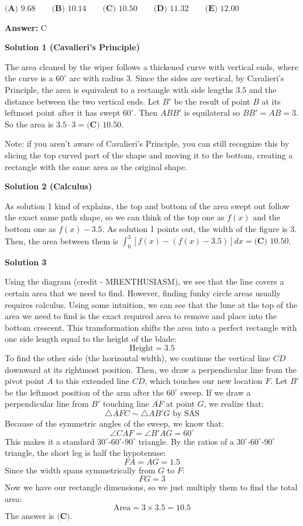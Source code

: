 \begin{enumerate}
 $\textbf{(A) } 9.68 \qquad \textbf{(B) } 10.14 \qquad \textbf{(C) } 10.50 \qquad \textbf{(D) } 11.32 \qquad \textbf{(E) } 12.00$

 \textbf{Answer: }C



\textbf{Solution 1 (Cavalieri's Principle)}

The area cleaned by the wiper follows a thickened curve with vertical ends, where the curve is a $60^\circ$ arc with radius $3$. Since the sides are vertical, by Cavalieri's Principle, the area is equivalent to a rectangle with side lengths $3.5$ and the distance between the two vertical ends. Let $B'$ be the result of point $B$ at its leftmost point after it has swept $60^\circ$. Then $ABB'$ is equilateral so $BB' = AB = 3$. So the area is $3.5 \cdot 3 = \boxed{\textbf{(C) } 10.50}$.

 Note: if you aren't aware of Cavalieri's Principle, you can still recognize this by slicing the top curved part of the shape and moving it to the bottom, creating a rectangle with the same area as the original shape.

 



\textbf{Solution 2 (Calculus)}

As solution 1 kind of explains, the top and bottom of the area swept out follow the exact same path shape, so we can think of the top one as $f(x)$ and the bottom one as $f(x)-3.5$. As solution 1 points out, the width of the figure is 3. Then, the area between them is $\int_{0}^{3}[f(x)-(f(x)-3.5)]dx = \boxed{\textbf{(C) } 10.50}$.

 



\textbf{Solution 3}

Using the diagram (credit - MRENTHUSIASM), we see that the line covers a certain area that we need to find. However, finding funky circle areas usually requires calculus. Using some intuition, we can see that the lune at the top of the area we need to find is the exact required area to remove and place into the bottom crescent. This transformation shifts the area into a perfect rectangle with one side length equal to the height of the blade:
 \[\text{Height} = 3.5\]To find the other side (the horizontal width), we continue the vertical line $\overline{CD}$ downward at its rightmost position. Then, we draw a perpendicular line from the pivot point $A$ to this extended line $\overline{CD}$, which touches our new location $F$. Let $B'$ be the leftmost position of the arm after the $60^\circ$ sweep. If we draw a perpendicular line from $B'$ touching line $\overline{AF}$ at point $G$, we realize that:
 \[\triangle AFC \sim \triangle AB'G \text{ by SAS}\]Because of the symmetric angles of the sweep, we know that:
 \[\angle CAF = \angle B'AG = 60^\circ\]This makes it a standard $30^\circ\text{-}60^\circ\text{-}90^\circ$ triangle. By the ratios of a $30^\circ\text{-}60^\circ\text{-}90^\circ$ triangle, the short leg is half the hypotenuse:
 \[FA = AG = 1.5\]Since the width spans symmetrically from $G$ to $F$:
 \[FG = 3\]Now we have our rectangle dimensions, so we just multiply them to find the total area:
 \[\text{Area} = 3 \times 3.5 = 10.5\]The answer is $\textbf{(C)}$.


\end{enumerate}
